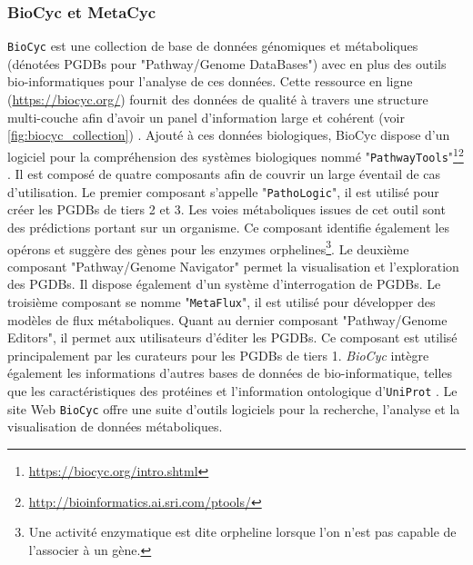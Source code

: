 \begin{refsegment}
    \subsubsection{BioCyc et MetaCyc}
    
    \texttt{BioCyc} \cite{caspi2006metacyc,caspi2007metacyc,caspi2008metacyc,caspi2010metacyc,caspi2012metacyc,caspi2013metacyc,caspi2014metacyc,caspi2015metacyc,caspi2016metacyc} est une collection de base de données génomiques et métaboliques (dénotées PGDBs pour "Pathway/Genome DataBases") avec en plus des outils bio-informatiques pour l'analyse de ces données. Cette ressource en ligne (\url{https://biocyc.org/}) fournit des données de qualité à travers une structure multi-couche afin d'avoir un panel d'information large et cohérent (voir \cref{fig:biocyc_collection}) . Ajouté à ces données biologiques, BioCyc dispose d'un logiciel pour la compréhension des systèmes biologiques nommé  "\texttt{PathwayTools}"\footnote{\url{https://biocyc.org/intro.shtml}}\footnote{\url{http://bioinformatics.ai.sri.com/ptools/}} \cite{karpe2011pathway,karp2015pathway}. Il est composé de quatre composants afin de couvrir un large éventail de cas d'utilisation. Le premier composant s'appelle "\texttt{PathoLogic}", il est utilisé pour créer les PGDBs de tiers 2 et 3. Les voies métaboliques issues de cet outil sont des prédictions portant sur un organisme. Ce composant identifie également les opérons \cite{romero2004using} et suggère des gènes pour les enzymes orphelines\footnote{Une activité enzymatique est dite orpheline lorsque l'on n'est pas capable de l'associer à un gène.}\cite{Green2004}. Le deuxième composant "Pathway/Genome Navigator" permet la visualisation et l'exploration des PGDBs. Il dispose également d'un système d'interrogation de PGDBs. Le troisième composant se nomme "\texttt{MetaFlux}", il est utilisé pour développer des modèles de flux métaboliques. Quant au dernier composant "Pathway/Genome Editors", il permet aux utilisateurs d'éditer les PGDBs. Ce composant est utilisé principalement par les curateurs pour les PGDBs de tiers 1. \textit{BioCyc} intègre également les informations d'autres bases de données de bio-informatique, telles que les caractéristiques des protéines et l'information ontologique d'\texttt{UniProt} . Le site Web \texttt{BioCyc} offre une suite d'outils logiciels pour la recherche, l'analyse et la visualisation de données métaboliques.
    

\end{refsegment}
